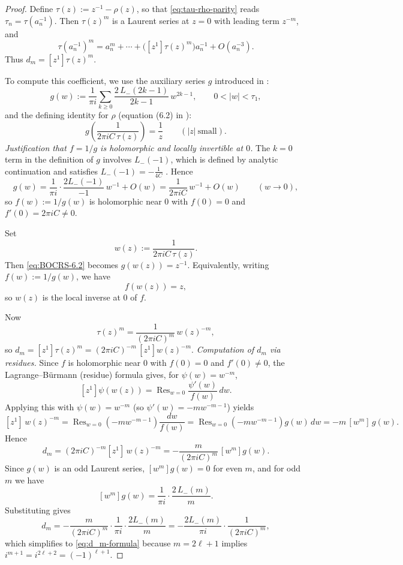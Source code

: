 \documentclass[11pt,letterpaper]{amsart}
\numberwithin{equation}{section}
\theoremstyle{definition}
\newcommand{\Res}{\operatorname{Res}}
\begin{document}
\begin{proof}
Define $\tau(z):=z^{-1}-\rho(z)$, so that \eqref{eq:tau-rho-parity} reads $\tau_n=\tau(a_n^{-1})$.
Then $\tau(z)^m$ is a Laurent series at $z=0$ with leading term $z^{-m}$, and
\[
\tau(a_n^{-1})^m = a_n^m+\cdots + \bigl([z^1]\tau(z)^m\bigr)a_n^{-1} + O(a_n^{-3}).
\]
Thus $d_m=[z^1]\tau(z)^m$.

To compute this coefficient, we use the auxiliary series $g$ introduced in \cite[\S6]{BOCRS}:
\[
g(w):=\frac{1}{\pi i}\sum_{k\ge0}\frac{2\,L_-(2k-1)}{2k-1}\,w^{2k-1},
\qquad 0<|w|<\tau_1,
\]
and the defining identity for $\rho$ (equation (6.2) in \cite{BOCRS}):
\begin{equation}\label{eq:BOCRS-6.2}
g\!\left(\frac{1}{2\pi i C\,\tau(z)}\right)=\frac{1}{z}\qquad (|z|\ \text{small}).
\end{equation}
\medskip
\noindent\emph{Justification that $f=1/g$ is holomorphic and locally invertible at $0$.}
The $k=0$ term in the definition of $g$ involves $L_-(-1)$, which is defined by analytic continuation
and satisfies $L_-(-1)=-\frac{1}{4C}$ \cite[\S10.2, eq.~(10.1)]{BOCRS}.  Hence
\[
g(w)=\frac{1}{\pi i}\cdot \frac{2L_-(-1)}{-1}\,w^{-1}+O(w)
=\frac{1}{2\pi i C}\,w^{-1}+O(w)\qquad(w\to0),
\]
so $f(w):=1/g(w)$ is holomorphic near $0$ with $f(0)=0$ and $f'(0)=2\pi i C\neq0$.

Set
\[
w(z):=\frac{1}{2\pi i C\,\tau(z)}.
\]
Then \eqref{eq:BOCRS-6.2} becomes $g(w(z))=z^{-1}$. Equivalently, writing $f(w):=1/g(w)$, we have
\begin{equation}\label{eq:inverse-relation}
f(w(z))=z,
\end{equation}
so $w(z)$ is the local inverse at $0$ of $f$.

Now
\[
\tau(z)^m = \frac{1}{(2\pi i C)^m}\,w(z)^{-m},
\]
so $d_m = [z^1]\tau(z)^m = (2\pi i C)^{-m}\,[z^1]w(z)^{-m}$.
\medskip
\noindent\emph{Computation of $d_m$ via residues.}
Since $f$ is holomorphic near $0$ with $f(0)=0$ and $f'(0)\neq0$, the Lagrange--B\"urmann
(residue) formula gives, for $\psi(w)=w^{-m}$,
\[
[z^1]\psi(w(z))=\Res_{w=0}\frac{\psi'(w)}{f(w)}\,dw.
\]
Applying this with $\psi(w)=w^{-m}$ (so $\psi'(w)=-m w^{-m-1}$) yields
\[
[z^1]\,w(z)^{-m}
=\Res_{w=0}\left(-m w^{-m-1}\right)\frac{dw}{f(w)}
=\Res_{w=0}\left(-m w^{-m-1}\right)g(w)\,dw
= -m\,[w^m]\,g(w).
\]
Hence
\[
d_m
=(2\pi i C)^{-m}[z^1]\,w(z)^{-m}
= -\frac{m}{(2\pi i C)^m}\,[w^m]g(w).
\]
Since $g(w)$ is an odd Laurent series, $[w^m]g(w)=0$ for even $m$, and for odd $m$ we have
\[
[w^m]g(w)=\frac{1}{\pi i}\cdot\frac{2\,L_-(m)}{m}.
\]
Substituting gives
\[
d_m
= -\frac{m}{(2\pi i C)^m}\cdot \frac{1}{\pi i}\cdot \frac{2 L_-(m)}{m}
= -\frac{2L_-(m)}{\pi i}\cdot\frac{1}{(2\pi i C)^m},
\]
which simplifies to \eqref{eq:d_m-formula} because $m=2\ell+1$ implies $i^{m+1}=i^{2\ell+2}=(-1)^{\ell+1}$.


\end{proof}
\end{document}
